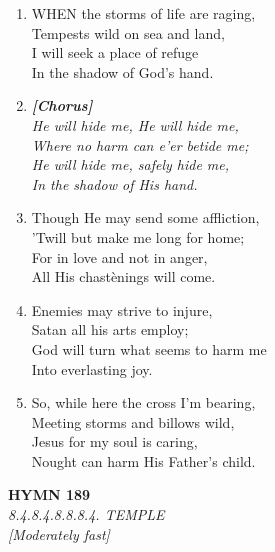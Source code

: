 \documentclass[11pt,a4paper]{article}
\begin{document}
\begin{enumerate}
    \item WHEN the storms of life are raging, \\
        Tempests wild on sea and land, \\
        I will seek a place of refuge \\
        In the shadow of God's hand.

    \item[] \vspace{0.4em}
    \textbf{\textit{[Chorus]}} \\
    \textit{He will hide me, He will hide me,} \\
    \textit{Where no harm can e'er betide me;} \\
    \textit{He will hide me, safely hide me,} \\
    \textit{In the shadow of His hand.}
    \vspace{0.4em}

    \item Though He may send some affliction, \\
        'Twill but make me long for home; \\
        For in love and not in anger, \\
        All His chast\`enings will come.

    \item Enemies may strive to injure, \\
        Satan all his arts employ; \\
        God will turn what seems to harm me \\
        Into everlasting joy.

    \item So, while here the cross I'm bearing, \\
        Meeting storms and billows wild, \\
        Jesus for my soul is caring, \\
        Nought can harm His Father's child.

\end{enumerate}

\newpage
\begin{center}
    {\Large \textbf{HYMN 189}}
    \\
    \textit{8.4.8.4.8.8.8.4. TEMPLE}
    \\
    \textit{\small [Moderately fast]}
\end{center}
\vspace{1em}
\end{document}
